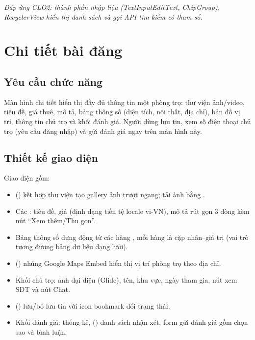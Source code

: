 \textit{Đáp ứng CLO2: thành phần nhập liệu (TextInputEditText, ChipGroup),
RecyclerView hiển thị danh sách và gọi API tìm kiếm có tham số.}

\section{Chi tiết bài đăng}

\subsection{Yêu cầu chức năng}
Màn hình chi tiết hiển thị đầy đủ thông tin một phòng trọ: thư viện ảnh/video,
tiêu đề, giá thuê, mô tả, bảng thông số (diện tích, nội thất, địa chỉ), bản đồ
vị trí, thông tin chủ trọ và khối đánh giá. Người dùng lưu tin, xem số điện
thoại chủ trọ (yêu cầu đăng nhập) và gửi đánh giá ngay trên màn hình này.

\subsection{Thiết kế giao diện}
Giao diện  gồm:
\begin{itemize}
    \item {} () kết hợp thư viện
     tạo gallery ảnh trượt ngang;
     tải ảnh bằng .
    \item Các : tiêu đề, giá (định dạng tiền tệ
     locale vi-VN), mô tả rút gọn 3 dòng kèm nút
    ``Xem thêm/Thu gọn''.
    \item Bảng thông số dựng động từ các hàng
    , mỗi hàng là cặp 
    nhãn--giá trị (vai trò tương đương bảng dữ liệu dạng lưới).
    \item {} () nhúng Google Maps Embed hiển thị vị trí
    phòng trọ theo địa chỉ.
    \item Khối chủ trọ: ảnh đại diện (Glide), tên, khu vực, ngày tham gia,
    nút xem SĐT và nút Chat.
    \item {} () lưu/bỏ lưu tin với icon
    bookmark đổi trạng thái.
    \item Khối đánh giá:  thống kê, 
    () danh sách nhận xét, form gửi đánh giá gồm
     chọn sao và  bình luận.
\end{itemize}

